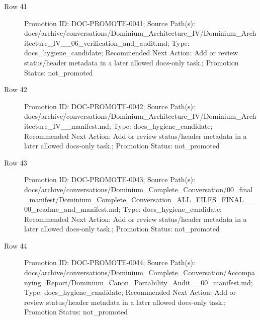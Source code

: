 \documentclass[9pt,a4paper,openany]{book}
\begin{document}
\begin{description}
\item[Row 41] Promotion ID: DOC-\allowbreak{}PROMOTE-\allowbreak{}0041; Source Path(s): docs/\allowbreak{}archive/\allowbreak{}conversations/\allowbreak{}Dominium\_\allowbreak{}Architecture\_\allowbreak{}IV/\allowbreak{}Dominium\_\allowbreak{}Architecture\_\allowbreak{}IV\_\allowbreak{}\_\allowbreak{}06\_\allowbreak{}verification\_\allowbreak{}and\_\allowbreak{}audit.\allowbreak{}md; Type: docs\_\allowbreak{}hygiene\_\allowbreak{}candidate; Recommended Next Action: Add or review status/\allowbreak{}header metadata in a later allowed docs-\allowbreak{}only task.\allowbreak{}; Promotion Status: not\_\allowbreak{}promoted
\item[Row 42] Promotion ID: DOC-\allowbreak{}PROMOTE-\allowbreak{}0042; Source Path(s): docs/\allowbreak{}archive/\allowbreak{}conversations/\allowbreak{}Dominium\_\allowbreak{}Architecture\_\allowbreak{}IV/\allowbreak{}Dominium\_\allowbreak{}Architecture\_\allowbreak{}IV\_\allowbreak{}\_\allowbreak{}manifest.\allowbreak{}md; Type: docs\_\allowbreak{}hygiene\_\allowbreak{}candidate; Recommended Next Action: Add or review status/\allowbreak{}header metadata in a later allowed docs-\allowbreak{}only task.\allowbreak{}; Promotion Status: not\_\allowbreak{}promoted
\item[Row 43] Promotion ID: DOC-\allowbreak{}PROMOTE-\allowbreak{}0043; Source Path(s): docs/\allowbreak{}archive/\allowbreak{}conversations/\allowbreak{}Dominium\_\allowbreak{}Complete\_\allowbreak{}Conversation/\allowbreak{}00\_\allowbreak{}final\_\allowbreak{}manifest/\allowbreak{}Dominium\_\allowbreak{}Complete\_\allowbreak{}Conversation\_\allowbreak{}ALL\_\allowbreak{}FILES\_\allowbreak{}FINAL\_\allowbreak{}\_\allowbreak{}00\_\allowbreak{}readme\_\allowbreak{}and\_\allowbreak{}manifest.\allowbreak{}md; Type: docs\_\allowbreak{}hygiene\_\allowbreak{}candidate; Recommended Next Action: Add or review status/\allowbreak{}header metadata in a later allowed docs-\allowbreak{}only task.\allowbreak{}; Promotion Status: not\_\allowbreak{}promoted
\item[Row 44] Promotion ID: DOC-\allowbreak{}PROMOTE-\allowbreak{}0044; Source Path(s): docs/\allowbreak{}archive/\allowbreak{}conversations/\allowbreak{}Dominium\_\allowbreak{}Complete\_\allowbreak{}Conversation/\allowbreak{}Accompanying\_\allowbreak{}Report/\allowbreak{}Dominium\_\allowbreak{}Canon\_\allowbreak{}Portability\_\allowbreak{}Audit\_\allowbreak{}\_\allowbreak{}00\_\allowbreak{}manifest.\allowbreak{}md; Type: docs\_\allowbreak{}hygiene\_\allowbreak{}candidate; Recommended Next Action: Add or review status/\allowbreak{}header metadata in a later allowed docs-\allowbreak{}only task.\allowbreak{}; Promotion Status: not\_\allowbreak{}promoted

\end{description}
\end{document}

